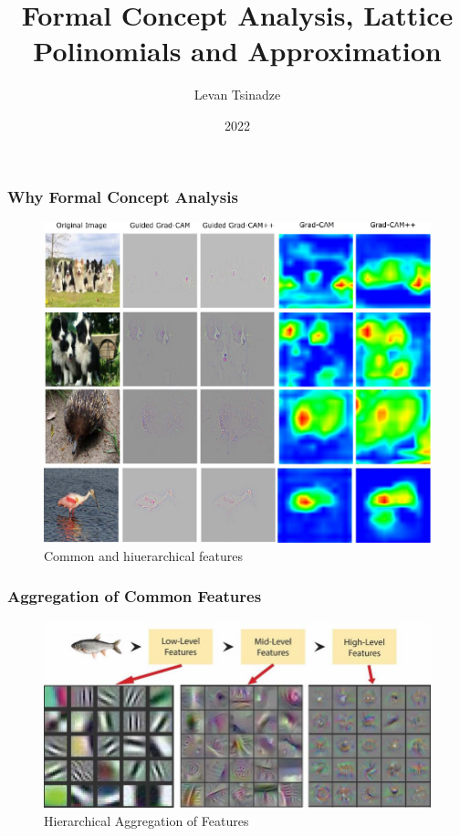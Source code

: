 \documentclass{beamer}
\title{Formal Concept Analysis, Lattice Polinomials and Approximation}
\author{Levan Tsinadze}
\institute{Tbilisi State University}
\date{2022}
\begin{document}
\frame{\titlepage}

\begin{frame}
    \frametitle{Why Formal Concept Analysis}
    \begin{figure}
        \includegraphics[width=\linewidth]{grad_cam_1.png}
        \caption{Common and hiuerarchical features}
        \label{fig:gradcam}
      \end{figure}
\end{frame}

\begin{frame}
    \frametitle{Aggregation of Common Features}
    \begin{figure}
        \includegraphics[width=\linewidth]{hierarchical_aggr.png}
        \caption{Hierarchical Aggregation of Features}
        \label{fig:hieragr}
      \end{figure}
\end{frame}
\end{document}
